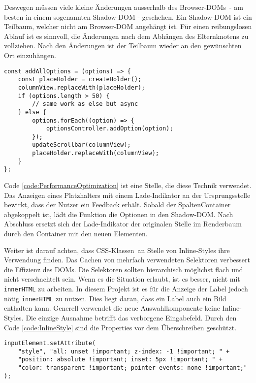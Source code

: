 Deswegen müssen viele kleine Änderungen ausserhalb des Browser-DOMs\footnotemark \ - am besten in einem sogenannten Shadow-DOM - geschehen.
Ein Shadow-DOM ist ein Teilbaum, welcher nicht am Browser-DOM angehängt ist.
Für einen reibungslosen Ablauf ist es sinnvoll, die Änderungen nach dem Abhängen des Elternknotens zu vollziehen. 
Nach den Änderungen ist der Teilbaum wieder an den gewünschten Ort einzuhängen.

\begin{lstlisting}[style = htmlcssjs, caption = Performance Optimierung (aus \texttt{columnOptionsComponent.js}), label = code:PerformanceOptimization]
const addAllOptions = (options) => {
    const placeHolder = createHolder();
    columnView.replaceWith(placeHolder);
    if (options.length > 50) {
        // same work as else but async
    } else {
        options.forEach((option) => {
            optionsController.addOption(option);
        });
        updateScrollbar(columnView);
        placeHolder.replaceWith(columnView);
    }
};
\end{lstlisting}

Code \ref{code:PerformanceOptimization} ist eine Stelle, die diese Technik verwendet.
Das Anzeigen eines Platzhalters mit einem Lade-Indikator an der Ursprungsstelle bewirkt, dass der Nutzer ein Feedback erhält.
Sobald der SpaltenContainer abgekoppelt ist, lädt die Funktion die Optionen in den Shadow-DOM.
Nach Abschluss ersetzt sich der Lade-Indikator der originalen Stelle im Renderbaum durch den Container mit den neuen Elementen.  

Weiter ist darauf achten, dass CSS-Klassen\footnotemark \ an Stelle von Inline-Styles ihre Verwendung finden.
Das Cachen von mehrfach verwendeten Selektoren verbessert die Effizienz des DOMs.
Die Selektoren sollten hierarchisch möglichst flach und nicht verschachtelt sein.
Wenn es die Situation erlaubt, ist es besser, nicht mit \texttt{innerHTML} zu arbeiten.
In diesem Projekt ist es für die Anzeige der Label jedoch nötig \texttt{innerHTML} zu nutzen.
Dies liegt daran, dass ein Label auch ein Bild enthalten kann.
Generell verwendet die neue Auswahlkomponente keine Inline-Styles.
Die einzige Ausnahme betrifft das verborgene Eingabefeld. 
Durch den Code \ref{code:InlineStyle} sind die Properties vor dem Überschreiben geschützt.

\begin{lstlisting}[style = htmlcssjs, caption = Inline-Style für Input-Feld, label = code:InlineStyle]
inputElement.setAttribute(
    "style", "all: unset !important; z-index: -1 !important; " +
    "position: absolute !important; inset: 5px !important; " +
    "color: transparent !important; pointer-events: none !important;"
);
\end{lstlisting}

